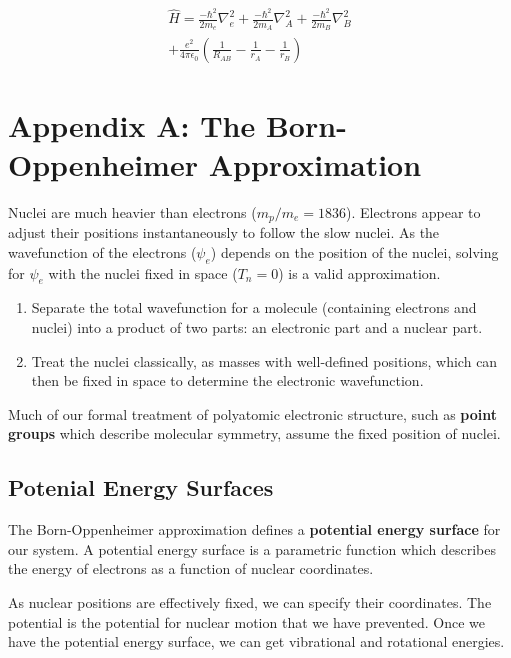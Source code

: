 \documentclass[a4paper]{tufte-handout}
\theoremstyle{definition}
\begin{document}
\begin{align}
  \hat{H} = \frac{-\hbar^2}{2m_e}\nabla^2_e + \frac{-\hbar^2}{2m_A}\nabla^2_A + \frac{-\hbar^2}{2m_B}\nabla^2_B \\
  + \frac{e^2}{4\pi\epsilon_0} \left( \frac{1}{R_{AB}} - \frac{1}{r_{A}} - \frac{1}{r_{B}} \right)
\end{align}

\section{Appendix A: The Born-Oppenheimer Approximation}

Nuclei are much heavier than electrons ($m_p / m_e = 1836$). Electrons appear to adjust their positions instantaneously to follow the slow nuclei.
As the wavefunction of the electrons ($\psi_e$) depends on the position of the nuclei, solving for $\psi_e$ with the nuclei fixed in space ($T_n = 0$) is a valid approximation.

\begin{enumerate}
  \item Separate the total wavefunction for a molecule (containing electrons and nuclei) into a product of two parts: an electronic part and a nuclear part.
  \item Treat the nuclei classically, as masses with well-defined positions, which can then be fixed in space to determine the electronic wavefunction.
\end{enumerate}

Much of our formal treatment of polyatomic electronic structure, such as \textbf{point groups}
which describe molecular symmetry, assume the fixed position of nuclei.

\subsection{Potenial Energy Surfaces}

The Born-Oppenheimer approximation defines a \textbf{potential energy surface} for our system.
A potential energy surface is a parametric function which describes the energy of electrons
as a function of nuclear coordinates. 

As nuclear positions are effectively fixed, we can specify their coordinates. The potential is the potential for nuclear motion that we have prevented.
Once we have the potential energy surface, 
we can get vibrational and rotational energies. 
\end{document}
